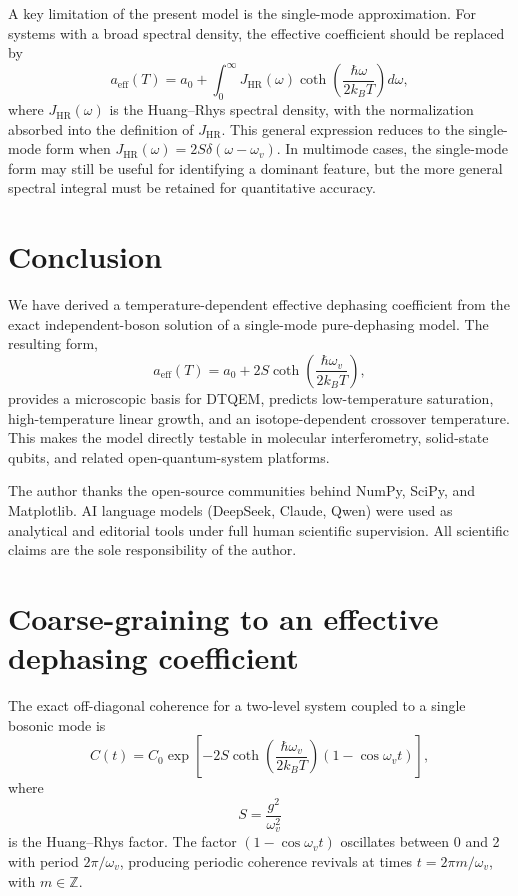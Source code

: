 \documentclass[aps,prl,twocolumn,showpacs,superscriptaddress,groupedaddress]{revtex4-2}
\begin{document}
A key limitation of the present model is the single-mode approximation. For systems with a broad spectral density, the effective coefficient should be replaced by
\[
a_{\mathrm{eff}}(T)=a_0+\int_0^\infty J_{\mathrm{HR}}(\omega)\coth\!\left(\frac{\hbar\omega}{2k_B T}\right)d\omega,
\]
where \(J_{\mathrm{HR}}(\omega)\) is the Huang–Rhys spectral density, with the normalization absorbed into the definition of \(J_{\mathrm{HR}}\). This general expression reduces to the single-mode form when \(J_{\mathrm{HR}}(\omega)=2S\delta(\omega-\omega_v)\). In multimode cases, the single-mode form may still be useful for identifying a dominant feature, but the more general spectral integral must be retained for quantitative accuracy.

\section{Conclusion}

We have derived a temperature-dependent effective dephasing coefficient from the exact independent-boson solution of a single-mode pure-dephasing model. The resulting form,
\[
a_{\mathrm{eff}}(T)=a_0+2S\coth\!\left(\frac{\hbar\omega_v}{2k_B T}\right),
\]
provides a microscopic basis for DTQEM, predicts low-temperature saturation, high-temperature linear growth, and an isotope-dependent crossover temperature. This makes the model directly testable in molecular interferometry, solid-state qubits, and related open-quantum-system platforms.

\begin{acknowledgments}
The author thanks the open-source communities behind NumPy, SciPy, and Matplotlib. AI language models (DeepSeek, Claude, Qwen) were used as analytical and editorial tools under full human scientific supervision. All scientific claims are the sole responsibility of the author.
\end{acknowledgments}

\appendix
\section{Coarse-graining to an effective dephasing coefficient}

The exact off-diagonal coherence for a two-level system coupled to a single bosonic mode is
\[
C(t)=C_0\exp\!\left[-2S\coth\!\left(\frac{\hbar\omega_v}{2k_B T}\right)(1-\cos\omega_v t)\right],
\]
where
\[
S=\frac{g^2}{\omega_v^2}
\]
is the Huang–Rhys factor. The factor \((1-\cos\omega_v t)\) oscillates between 0 and 2 with period \(2\pi/\omega_v\), producing periodic coherence revivals at times \(t=2\pi m/\omega_v\), with \(m\in\mathbb{Z}\).
\end{document}
